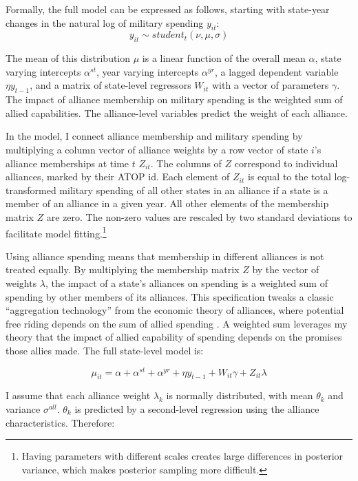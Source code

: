 \documentclass[12pt]{article}
\begin{document}
Formally, the full model can be expressed as follows, starting with state-year changes in the natural log of military spending $y_{it}$:
\begin{equation}
y_{it} \sim student_t(\nu, \mu, \sigma) 
\end{equation}

The mean of this distribution $\mu$ is a linear function of the overall mean $\alpha$, state varying intercepts $\alpha^{st}$, year varying intercepts $\alpha^{yr}$, a lagged dependent variable $\eta y_{t-1}$, and a matrix of state-level regressors $W_{it}$ with a vector of parameters $\gamma$. The impact of alliance membership on military spending is the weighted sum of allied capabilities. The alliance-level variables predict the weight of each alliance. 

In the model, I connect alliance membership and military spending by multiplying a column vector of alliance weights by a row vector of state $i$'s alliance memberships at time $t$ $Z_{it}$. The columns of $Z$ correspond to individual alliances, marked by their ATOP id. Each element of $Z_{it}$ is equal to the total log-transformed military spending of all other states in an alliance if a state is a member of an alliance in a given year. All other elements of the membership matrix $Z$ are zero. The non-zero values are rescaled by two standard deviations to facilitate model fitting.\footnote{Having parameters with different scales creates large differences in posterior variance, which makes posterior sampling more difficult.} 

Using alliance spending means that membership in different alliances is not treated equally. By multiplying the membership matrix $Z$ by the vector of weights $\lambda$, the impact of a state's alliances on spending is a weighted sum of spending by other members of its alliances. This specification tweaks a classic ``aggregation technology'' from the economic theory of alliances, where potential free riding depends on the sum of allied spending \citep{Murdoch1995}. A weighted sum leverages my theory that the impact of allied capability of spending depends on the promises those allies made. The full state-level model is:

\begin{equation}
\mu_{it} = \alpha + \alpha^{st} + \alpha^{yr} + \eta y_{t-1} + W_{it} \gamma + Z_{it} \lambda 
\end{equation}

I assume that each alliance weight $\lambda_k$ is normally distributed, with mean $\theta_k$ and variance $\sigma^{all}$. $\theta_k$ is predicted by a second-level regression using the alliance characteristics. Therefore:
\end{document}
